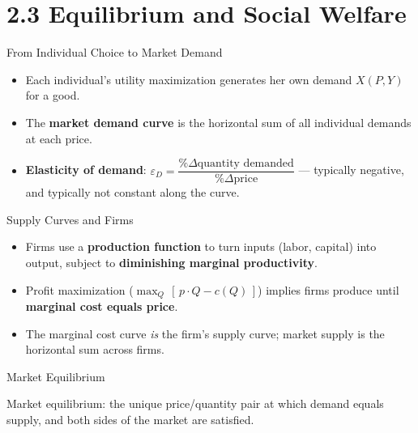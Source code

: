 \documentclass[11pt,aspectratio=169]{beamer}
\begin{document}
\section{2.3 Equilibrium and Social Welfare}

\begin{frame}{From Individual Choice to Market Demand}
  \begin{itemize}
    \item Each individual's utility maximization generates her own demand $X(P,Y)$ for a good.
    \item The \textbf{market demand curve} is the horizontal sum of all individual demands at each price.
    \item \textbf{Elasticity of demand}: $\varepsilon_D = \dfrac{\%\Delta \text{quantity demanded}}{\%\Delta \text{price}}$ --- typically negative, and typically not constant along the curve.
  \end{itemize}
\end{frame}

\begin{frame}{Supply Curves and Firms}
  \begin{itemize}
    \item Firms use a \textbf{production function} to turn inputs (labor, capital) into output, subject to \textbf{diminishing marginal productivity}.
    \item Profit maximization ($\max_Q\, [\,p\cdot Q - c(Q)\,]$) implies firms produce until \textbf{marginal cost equals price}.
    \item The marginal cost curve \emph{is} the firm's supply curve; market supply is the horizontal sum across firms.
  \end{itemize}
\end{frame}

\begin{frame}{Market Equilibrium}
  \begin{center}
  \end{center}
  \centering \small
  Market equilibrium: the unique price/quantity pair at which demand equals supply, and both sides of the market are satisfied.
\end{frame}
\end{document}
